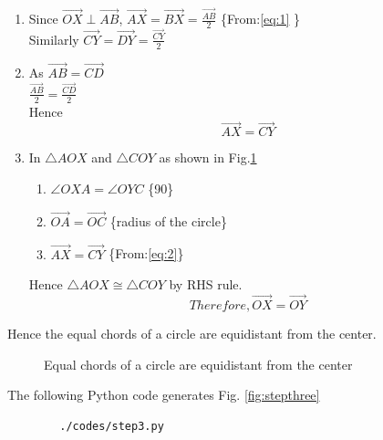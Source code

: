 \begin{enumerate}
\begin{enumerate}
	
	\item Since $\vec{OX} \perp \vec{AB}$, $\vec{AX} =  \vec{BX} = \frac{\vec{AB}}{2}$ \{From:\eqref{eq:1} \}\\
	Similarly $\vec{CY} =  \vec{DY} = \frac{\vec{CY}}{2}$\\
	\item As $\vec{AB} =  \vec{CD}$\\
	$\frac{\vec{AB}}{2} = \frac{\vec{CD}}{2}$\\
	Hence 
	\begin{equation}
	\vec{AX} =  \vec{CY} \label{eq:2}
	\end{equation}
	
	\item In $\triangle AOX$ and $\triangle COY $ as shown in Fig.\ref{fig:steptwotex}\\
	
	\begin{enumerate}
	\item $\angle{OXA} = \angle{OYC} $ \quad \{90\degree\}
	\item $\vec{OA} = \vec{OC}$ \quad \{radius of the circle\}
	\item $\vec{AX} = \vec{CY}$ \quad \{From:\eqref{eq:2}\}
	\end{enumerate}
	Hence  $\triangle AOX \cong \triangle COY $ by RHS rule.\\
	\begin{equation}
	Therefore, \vec{OX}=\vec{OY} \label{eq:3}
	\end{equation}
\end{enumerate}
	Hence the equal chords of a circle are equidistant from the center.\\

  
\begin{figure}[!ht]
\centering
\resizebox{\columnwidth}{!}{}
\caption{Equal chords of a circle are equidistant from the center}
\label{fig:steptwotex}	
\end{figure}


The  following Python code generates Fig. \ref{fig:stepthree}\\
    \begin{lstlisting}
        ./codes/step3.py
    \end{lstlisting}


\end{enumerate}

